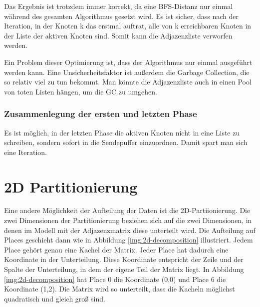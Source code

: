 Das Ergebnis ist trotzdem immer korrekt, da eine BFS-Distanz nur einmal während des gesamten Algorithmus gesetzt wird. Es ist sicher, dass nach der Iteration, in der Knoten k das erstmal auftrat, alle von k erreichbaren Knoten in der Liste der aktiven Knoten sind. Somit kann die Adjazenzliste verworfen werden.

Ein Problem dieser Optimierung ist, dass der Algorithmus nur einmal ausgeführt werden kann. Eine Unsicherheitsfaktor ist außerdem die Garbage Collection, die so relativ viel zu tun bekommt. Man könnte die Adjazenzliste auch in einen Pool von toten Listen hängen, um die GC zu umgehen.
\subsubsection{Zusammenlegung der ersten und letzten Phase} %
\label{ssub:zusammenlegung_der_ersten_und_letzten_phase}
Es ist möglich, in der letzten Phase die aktiven Knoten nicht in eine Liste zu schreiben, sondern sofort in die Sendepuffer einzuordnen. Damit spart man sich eine Iteration.


\section{2D Partitionierung} %
\label{sec:2d_partitionierung}

Eine andere Möglichkeit der Aufteilung der Daten ist die 2D-Partiionierung. Die zwei Dimensionen der Partitionierung beziehen sich auf die zwei Dimensionen, in denen im Modell mit der Adjazenzmatrix diese unterteilt wird. Die Aufteilung auf Places geschieht dann wie in Abbildung \ref{img:2d-decomposition} illustriert. Jedem Place gehört genau eine Kachel der Matrix. Jeder Place hat dadurch eine Koordinate in der Unterteilung. Diese Koordinate entspricht der Zeile und der Spalte der Unterteilung, in dem der eigene Teil der Matrix liegt. In Abbildung \ref{img:2d-decomposition} hat Place 0 die Koordinate (0,0) und Place 6 die Koordinate (1,2). Die Matrix wird so unterteilt, dass die Kacheln möglichst quadratisch und gleich groß sind.

